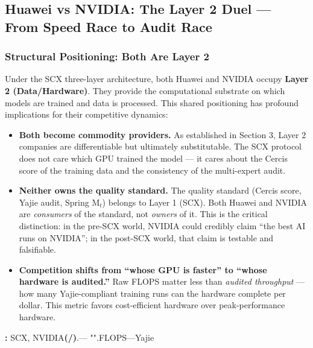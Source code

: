 \documentclass[12pt,a4paper]{article}
\theoremstyle{remark}
\begin{document}
\subsection{Huawei vs NVIDIA: The Layer 2 Duel --- From Speed Race to Audit Race}
\subsubsection{Structural Positioning: Both Are Layer 2}
Under the SCX three-layer architecture, both Huawei and NVIDIA occupy 
\textbf{Layer 2 (Data/Hardware)}. They provide the computational substrate
on which models are trained and data is processed. This shared positioning 
has profound implications for their competitive dynamics:
\begin{itemize}
 \item \textbf{Both become commodity providers.} As established in 
 Section 3, Layer 2 companies are differentiable but ultimately 
 substitutable. The SCX protocol does not care which GPU trained 
 the model --- it cares about the Cercis score of the training data 
 and the consistency of the multi-expert audit.
 \item \textbf{Neither owns the quality standard.} The quality standard 
 (Cercis score, Yajie audit, Spring M$_t$) belongs to Layer 1 
 (SCX). Both Huawei and NVIDIA are \textit{consumers} of the 
 standard, not \textit{owners} of it. This is the critical 
 distinction: in the pre-SCX world, NVIDIA could credibly claim 
 ``the best AI runs on NVIDIA''; in the post-SCX world, that 
 claim is testable and falsifiable.
 \item \textbf{Competition shifts from ``whose GPU is faster'' to 
 ``whose hardware is audited.''} Raw FLOPS matter less than 
 \textit{audited throughput} --- how many Yajie-compliant training 
 runs can the hardware complete per dollar. This metric favors 
 cost-efficient hardware over peak-performance hardware.
\end{itemize}
\noindent\textbf{: }
SCX, NVIDIA\textbf{(/)}.---
"".FLOPS\textit{}---Yajie
\end{document}
